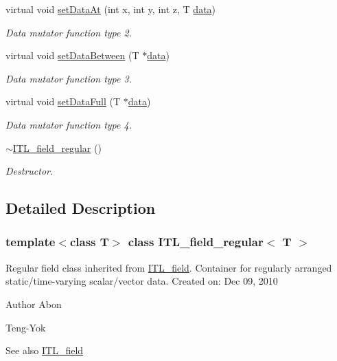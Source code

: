 \begin{DoxyCompactItemize}
virtual void \hyperlink{classITL__field__regular_a38fef3e9ec1551e58d217dcb29bcbc4b}{setDataAt} (int x, int y, int z, T \hyperlink{MainIT__regvector_8cpp_a783b2b1c03f80ec0d3ed965238d6bd65}{data})
\begin{DoxyCompactList}\small\item\em Data mutator function type 2. \item\end{DoxyCompactList}\item 
virtual void \hyperlink{classITL__field__regular_a07a0497a570f77755528aa9fc1e50934}{setDataBetween} (T $\ast$\hyperlink{MainIT__regvector_8cpp_a783b2b1c03f80ec0d3ed965238d6bd65}{data})
\begin{DoxyCompactList}\small\item\em Data mutator function type 3. \item\end{DoxyCompactList}\item 
virtual void \hyperlink{classITL__field__regular_aff339caac0e4e04156553b6b1c194fea}{setDataFull} (T $\ast$\hyperlink{MainIT__regvector_8cpp_a783b2b1c03f80ec0d3ed965238d6bd65}{data})
\begin{DoxyCompactList}\small\item\em Data mutator function type 4. \item\end{DoxyCompactList}\item 
\hyperlink{classITL__field__regular_a61df91153315ad7033658ab3fe811c25}{$\sim$ITL\_\-field\_\-regular} ()
\begin{DoxyCompactList}\small\item\em Destructor. \item\end{DoxyCompactList}\end{DoxyCompactItemize}


\subsection{Detailed Description}
\subsubsection*{template$<$class T$>$ class ITL\_\-field\_\-regular$<$ T $>$}

Regular field class inherited from \hyperlink{classITL__field}{ITL\_\-field}. Container for regularly arranged static/time-\/varying scalar/vector data. Created on: Dec 09, 2010 \begin{DoxyAuthor}{Author}
Abon 

Teng-\/Yok 
\end{DoxyAuthor}
\begin{DoxySeeAlso}{See also}
\hyperlink{classITL__field}{ITL\_\-field} 
\end{DoxySeeAlso}


